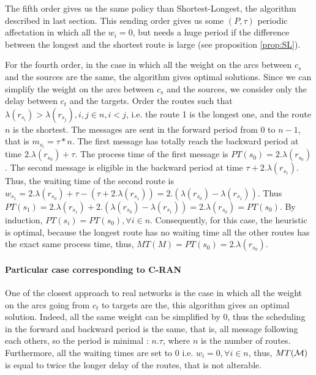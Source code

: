\documentclass[a4paper,10pt]{article}
\begin{document}
	The fifth order gives us the same policy than Shortest-Longest, the algorithm described in last section. This sending order gives us some $(P,\tau)$ periodic affectation in which all the $w_i = 0$, but needs a huge period if the difference between the longest and the shortest route is large (see proposition \ref{prop:SL}).

	For the fourth order, in the case in which all the weight on the arcs between $c_s$ and the sources are the same, the algorithm gives optimal solutions.
	Since we can simplify the weight on the arcs between $c_s$ and the sources, we consider only the delay between $c_t$ and the targets. Order the routes such that $\lambda(r_{s_i}) > \lambda(r_{s_j}), i,j \in n, i<j$, i.e. the route 1 is the longest one, and the route $n$ is the shortest.
	The messages are sent in the forward period from 0 to $n-1$, that is $m_{s_i} = \tau * n$.
	The first message has totally reach the backward period at time $2.\lambda(r_{s_0})+\tau$. The process time of the first message is $PT(s_0) = 2.\lambda(r_{s_0}) $.
	The second message is eligible in the backward period at time $\tau + 2.\lambda(r_{s_1})$. Thus, the waiting time of the second route is $w_{s_1} = 2.\lambda(r_{s_0})+\tau - (\tau + 2.\lambda(r_{s_1})) = 2.(\lambda(r_{s_0}) - \lambda(r_{s_1}))$. Thus $PT(s_1) = 2.\lambda(r_{s_1}) + 2.(\lambda(r_{s_0}) - \lambda(r_{s_1}))  = 2.\lambda(r_{s_0})  = PT(s_0)$.
	By induction, $PT(s_i) = PT(s_0), \forall i \in n$. 
	Consequently, for this case, the heuristic is optimal, because the longest route has no waiting time all the other routes has the exact same process time, thus, $MT(M) = PT(s_0) = 2.\lambda(r_{s_0}) $.

	\paragraph{Particular case corresponding to C-RAN}
		
	One of the closest approach to real networks is the case in which all the weight on the arcs going from $c_t$ to targets are the, this algorithm gives an optimal solution. Indeed, all the same weight can be simplified by 0, thus the scheduling in the forward and backward period is the same, that is, all message following each others, so the period is minimal : $n.\tau$, where $n$ is the number of routes. Furthermore, all the waiting times are set to 0 i.e. $w_i = 0,\forall i \in n$, thus, $MT({\cal M})$ is equal to twice the longer delay of the routes, that is not alterable.
\end{document}
